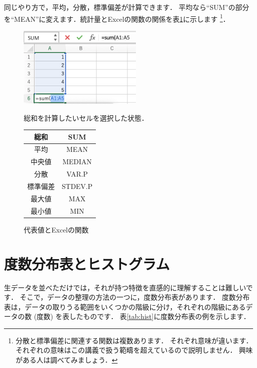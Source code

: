 同じやり方で，平均，分散，標準偏差が計算できます．
平均なら``SUM''の部分を``MEAN''に変えます．統計量とExcelの関数の関係を表\ref{tab:funcs}に示します
\footnote{分散と標準偏差に関連する関数は複数あります．
  それぞれ意味が違います．
  それぞれの意味はこの講義で扱う範疇を超えているので説明しません．
  興味がある人は調べてみましょう．}．

\begin{figure}[htbp]
    \begin{minipage}{0.5\hsize}
        \centering
        \includegraphics[width=6cm]{chap1/sum.png}
        \caption{総和を計算したいセルを選択した状態．}
        \label{fig:sum}
    \end{minipage}
    \begin{minipage}{0.5\hsize}
        \centering
        \makeatletter
        \def\@captype{table}
        \makeatother
        \caption{代表値とExcelの関数}
        \begin{tabular}{|c|c|}
          \hline
          総和     & SUM\\ \hline
          平均     & MEAN\\ \hline
          中央値   & MEDIAN \\ \hline
          分散     & VAR.P\\ \hline
          標準偏差 & STDEV.P \\ \hline
          最大値   & MAX \\ \hline
          最小値   & MIN \\ \hline
        \end{tabular}
        \label{tab:funcs}
    \end{minipage}
\end{figure}

\section{度数分布表とヒストグラム}

生データを並べただけでは，それが持つ特徴を直感的に理解することは難しいです．
そこで，データの整理の方法の一つに，度数分布表があります．
度数分布表は，データの取りうる範囲をいくつかの階級に分け，それぞれの階級にあるデータの数 (度数) を表したものです．
表\ref{tab:hist}に度数分布表の例を示します．

